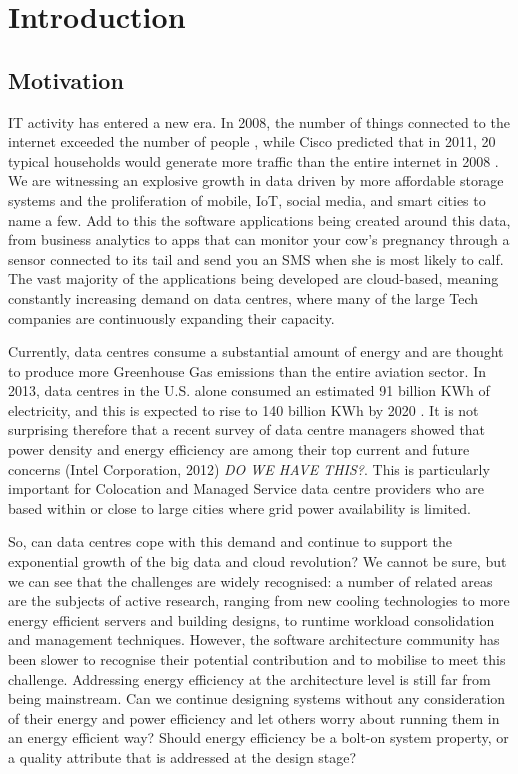 \chapter{Introduction}
\label{chapter:introduction}

\section{Motivation}

IT activity has entered a new era. In 2008, the number of things connected to the internet exceeded the number of people \cite{evans2008-iotinfo}, while Cisco predicted that in 2011, 20 typical households would generate more traffic than the entire internet in 2008 \cite{evans2008-iotinfo}. We are witnessing an explosive growth in data driven by more affordable storage systems and the proliferation of mobile, IoT, social media, and smart cities to name a few. Add to this the software applications being created around this data, from business analytics to apps that can monitor your cow's pregnancy through a sensor connected to its tail and send you an SMS when she is most likely to calf. The vast majority of the applications being developed are cloud-based, meaning constantly increasing demand on data centres, where many of the large Tech companies are continuously expanding their capacity. 

Currently, data centres consume a substantial amount of energy and are thought to produce more Greenhouse Gas emissions than the entire aviation sector. In 2013, data centres in the U.S. alone consumed an estimated 91 billion KWh of electricity, and this is expected to rise to 140 billion KWh by 2020 \cite{delforge2014-datacentreenergy}. It is not surprising therefore that a recent survey of data centre managers showed that power density and energy efficiency are among their top current and future concerns (Intel Corporation, 2012) \textit{DO WE HAVE THIS?}. This is particularly important for Colocation and Managed Service data centre providers who are based within or close to large cities where grid power availability is limited. 

So, can data centres cope with this demand and continue to support the exponential growth of the big data and cloud revolution? We cannot be sure, but we can see that the challenges are widely recognised: a number of related areas are the subjects of active research, ranging from new cooling technologies to more energy efficient servers and building designs, to runtime workload consolidation and management techniques. However, the software architecture community has been slower to recognise their potential contribution and to mobilise to meet this challenge. Addressing energy efficiency at the architecture level is still far from being mainstream. Can we continue designing systems without any consideration of their energy and power efficiency and let others worry about running them in an energy efficient way? Should energy efficiency be a bolt-on system property, or a quality attribute that is addressed at the design stage?

